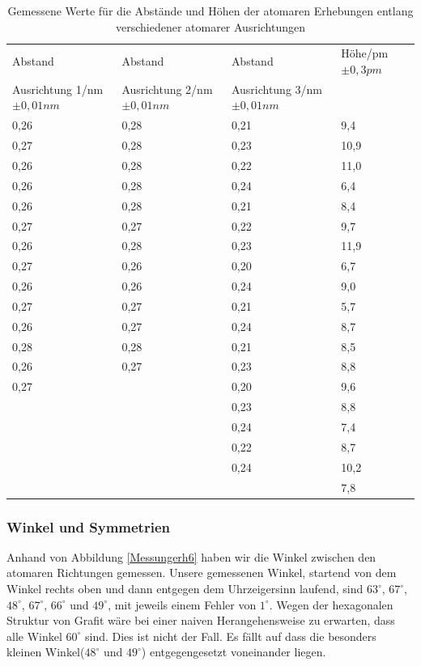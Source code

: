 \documentclass[10pt,a4paper]{article}
\begin{document}
\begin{table}[h!]
	\centering
	\begin{tabular}{|l|l|l|l|}\hline
		Abstand & Abstand & Abstand & Höhe/pm $\pm 0,3 pm$\\
		Ausrichtung 1/nm $\pm 0,01 nm$ & Ausrichtung 2/nm $\pm 0,01 nm$ & Ausrichtung 3/nm $\pm 0,01 nm$ & \\\hline
		0,26 & 0,28 & 0,21 & 9,4 \\
		0,27 & 0,28 & 0,23 & 10,9 \\
		0,26 & 0,28 & 0,22 & 11,0\\
		0,26& 0,28 & 0,24 & 6,4 \\
		0,26 & 0,28 & 0,21 & 8,4 \\
		0,27 & 0,27 & 0,22 & 9,7 \\
		0,26 & 0,28 & 0,23 & 11,9\\
		0,27 & 0,26 & 0,20 & 6,7\\
		0,26 & 0,26 & 0,24 & 9,0\\
		0,27 & 0,27 & 0,21 & 5,7\\
		0,26 & 0,27 & 0,24 & 8,7\\
		0,28 & 0,28 & 0,21 & 8,5\\
		0,26 & 0,27 & 0,23 & 8,8\\
		0,27 &  & 0,20 & 9,6\\
		&  & 0,23 & 8,8\\
		&  & 0,24 & 7,4\\
		&  & 0,22 & 8,7\\
		&  & 0,24 & 10,2\\
		&  &  & 7,8\\
		\hline
	\end{tabular}
	\caption{Gemessene Werte für die Abstände und Höhen der atomaren Erhebungen entlang verschiedener atomarer Ausrichtungen}
	\label{Messungerh5}
\end{table}

\subsubsection{Winkel und Symmetrien} \label{winkelsec}

Anhand von Abbildung \ref{Messungerh6} haben wir die Winkel zwischen den atomaren Richtungen gemessen. Unsere gemessenen Winkel, startend von dem Winkel rechts oben und dann entgegen dem Uhrzeigersinn laufend, sind $63^\circ$, $67^\circ$, $48^\circ$, $67^\circ$, $66^\circ$ und $49^\circ$, mit jeweils einem Fehler von $1^\circ$. Wegen der hexagonalen Struktur von Grafit wäre bei einer naiven Herangehensweise zu erwarten, dass alle Winkel $60^\circ$ sind. Dies ist nicht der Fall. Es fällt auf dass die besonders kleinen Winkel($48^\circ$ und $49^\circ$) entgegengesetzt voneinander liegen. 
\end{document}
